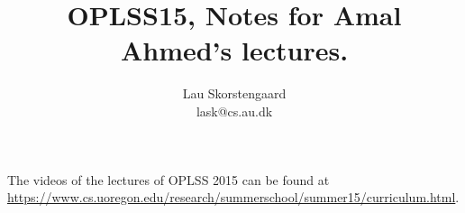 \documentclass[a4paper,10pt,fleqn]{article}
\author{Lau Skorstengaard\\lask@cs.au.dk}
\title{OPLSS15, Notes for Amal Ahmed's lectures.}
\begin{document}
\maketitle The videos of the lectures of OPLSS 2015 can be found at \url{https://www.cs.uoregon.edu/research/summerschool/summer15/curriculum.html}. 
%
%

%
%
\end{document}
